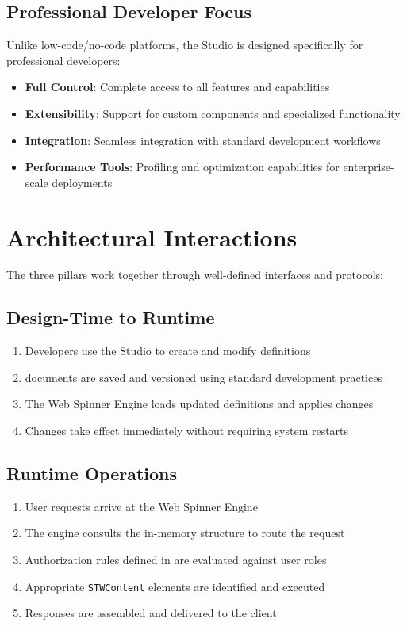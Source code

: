 \subsection{Professional Developer Focus}

Unlike low-code/no-code platforms, the Studio is designed specifically for professional developers:

\begin{itemize}
	\item \textbf{Full Control}: Complete access to all \wbdl{} features and capabilities
	\item \textbf{Extensibility}: Support for custom components and specialized functionality
	\item \textbf{Integration}: Seamless integration with standard development workflows
	\item \textbf{Performance Tools}: Profiling and optimization capabilities for enterprise-scale deployments
\end{itemize}

\section{Architectural Interactions}
\label{sec:architectural-interactions}

The three pillars work together through well-defined interfaces and protocols:

\subsection{Design-Time to Runtime}

\begin{enumerate}
	\item Developers use the Studio to create and modify \webbase{} definitions
	\item \wbdl{} documents are saved and versioned using standard development practices
	\item The Web Spinner Engine loads updated \webbase{} definitions and applies changes
	\item Changes take effect immediately without requiring system restarts
\end{enumerate}

\subsection{Runtime Operations}

\begin{enumerate}
	\item User requests arrive at the Web Spinner Engine
	\item The engine consults the in-memory \webbase{} structure to route the request
	\item Authorization rules defined in \wbdl{} are evaluated against user roles
	\item Appropriate \texttt{STWContent} elements are identified and executed
	\item Responses are assembled and delivered to the client
\end{enumerate}

